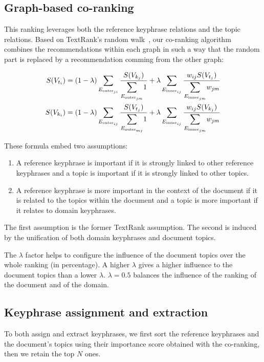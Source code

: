  \subsection{Graph-based co-ranking}
  \label{subsec:graph_based_co_ranking}
    This ranking leverages both the reference keyphrase relations and the topic
    relations. Based on TextRank's random walk~\cite{mihalcea2004textrank}, our
    co-ranking algorithm combines the recommendations within each graph in such
    a way that the random part is replaced by a recommendation comming from the
    other graph:
    \begin{tiny}
      \begin{align}
        S(V_{t_i}) &= (1 - \lambda) \sum_{E_{\text{outer}_{ji}}}{\frac{S(V_{k_j})}{\mathlarger\sum_{E_{\text{outer}_{jm}}}{1}}} + \lambda \sum_{E_{\text{inner}_{ij}}}{\frac{w_{ij} S(V_{t_j})}{\mathlarger\sum_{E_{\text{inner}_{jm}}}{{w_{jm}}}}}\\
        S(V_{k_i}) &= (1 - \lambda) \sum_{E_{\text{outer}_{ij}}}{\frac{S(V_{t_j})}{\mathlarger\sum_{E_{\text{outer}_{mj}}}{1}}} + \lambda \sum_{E_{\text{inner}_{ij}}}{\frac{w_{ij} S(V_{k_j})}{\mathlarger\sum_{E_{\text{inner}_{jm}}}{{w_{jm}}}}}
      \end{align}
    \end{tiny}
    These formula embed two assumptions:
    \begin{enumerate}
      \item{A reference keyphrase is important if it is strongly linked to other
            reference keyphrases and a topic is important if it is strongly
            linked to other topics.}
      \item{A reference keyphrase is more important in the context of the
            document if it is related to the topics within the document and a
            topic is more important if it relates to domain keyphrases.}
    \end{enumerate}
    The first assumption is the former TextRank assumption. The second is
    induced by the unification of both domain keyphrases and document topics.

    The $\lambda$ factor helps to configure the influence of the document topics
    over the whole ranking (in percentage). A higher $\lambda$ gives a higher
    influence to the document topics than a lower $\lambda$. $\lambda=0.5$
    balances the influence of the ranking of the document and of the domain.

  \subsection{Keyphrase assignment and extraction}
  \label{subsec:keyphrase_assignment_and_extraction}
    To both assign and extract keyphrases, we first sort the reference
    keyphrases and the document's topics using their importance score obtained
    with the co-ranking, then we retain the top $N$ ones.

